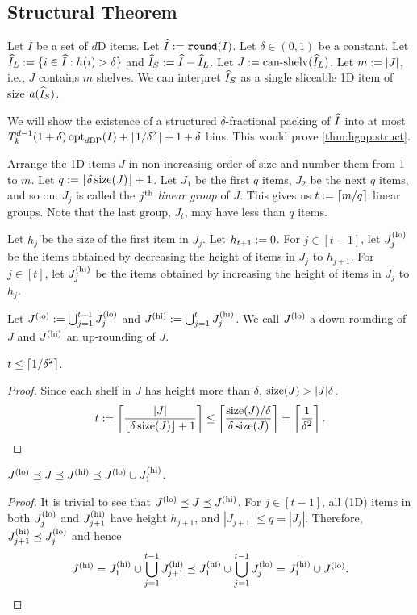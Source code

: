 \subsection{Structural Theorem}
\label{sec:hgap:struct}

Let $I$ be a set of $d$D items.
Let $\widehat{I} := \operatorname{\mathtt{round}}(I)$.
Let $\delta \in (0, 1)$ be a constant.
Let $\widehat{I}_L := \{i \in \widehat{I}: h(i) > \delta\}$ and $\widehat{I}_S := \widehat{I} - \widehat{I}_L$.
Let $J := \operatorname{can-shelv}(\widehat{I}_L)$. Let $m := |J|$, i.e., $J$ contains $m$ shelves.
We can interpret $\widehat{I}_S$ as a single sliceable 1D item of size $a(\widehat{I}_S)$.

We will show the existence of a structured $\delta$-fractional packing of $\widehat{I}$
into at most $T_k^{d-1}(1+\delta)\operatorname{opt}_{d\mathrm{BP}}(I) + \lceil 1/\delta^2 \rceil + 1 + \delta$ bins.
This would prove \cref{thm:hgap:struct}.

\begin{definition}
\label{defn:hgap:lingroup}
Arrange the 1D items $J$ in non-increasing order of size and number them from 1 to $m$.
Let $q := \left\lfloor \delta\operatorname{size}(J) \right\rfloor + 1$.
Let $J_1$ be the first $q$ items, $J_2$ be the next $q$ items, and so on.
$J_j$ is called the $j^{\textrm{th}}$ \emph{linear group} of $J$.
This gives us $t := \left\lceil m/q \right\rceil$ linear groups.
Note that the last group, $J_t$, may have less than $q$ items.

Let $h_j$ be the size of the first item in $J_j$. Let $h_{t+1} := 0$.
For $j \in [t-1]$, let $J_j^{\mathrm{(lo)}}$ be the items obtained by
decreasing the height of items in $J_j$ to $h_{j+1}$.
For $j \in [t]$, let $J_j^{\mathrm{(hi)}}$ be the items obtained by
increasing the height of items in $J_j$ to $h_j$.

Let ${J^{\mathrm{(lo)}} := \bigcup_{j=1}^{t-1} J_j^{\mathrm{(lo)}}}$
and ${J^{\mathrm{(hi)}} := \bigcup_{j=1}^t J_j^{\mathrm{(hi)}}}$.
We call $J^{\mathrm{(lo)}}$ a down-rounding of $J$ and $J^{\mathrm{(hi)}}$ an up-rounding of $J$.
\end{definition}

\begin{lemma}
\label{thm:hgap:n-pivots}
$t \le \lceil 1/\delta^2 \rceil$.
\end{lemma}
\begin{proof}
Since each shelf in $J$ has height more than $\delta$, $\operatorname{size}(J) > |J|\delta$.
\[ t := \left\lceil \frac{|J|}{\left\lfloor \delta\operatorname{size}(J) \right\rfloor+1} \right\rceil
\le \left\lceil \frac{\operatorname{size}(J)/\delta}{\delta\operatorname{size}(J)} \right\rceil
= \left\lceil \frac{1}{\delta^2} \right\rceil.
\qedhere \]
\end{proof}

\begin{lemma}
\label{thm:hgap:pred-chain}
$J^{\mathrm{(lo)}} \preceq J \preceq J^{\mathrm{(hi)}} \preceq J^{\mathrm{(lo)}} \cup J_1^{\mathrm{(hi)}}$.
\end{lemma}
\begin{proof}
It is trivial to see that $J^{\mathrm{(lo)}} \preceq J \preceq J^{\mathrm{(hi)}}$.
For $j \in [t-1]$, all (1D) items in both $J_j^{\mathrm{(lo)}}$ and $J_{j+1}^{\mathrm{(hi)}}$ have height $h_{j+1}$,
and $|J_{j+1}| \le q = |J_j|$. Therefore, $J_{j+1}^{\mathrm{(hi)}} \preceq J_j^{\mathrm{(lo)}}$ and hence
\[ J^{\mathrm{(hi)}} = J_1^{\mathrm{(hi)}} \cup \bigcup_{j=1}^{t-1} J_{j+1}^{\mathrm{(hi)}}
\preceq J_1^{\mathrm{(hi)}} \cup \bigcup_{j=1}^{t-1} J_j^{\mathrm{(lo)}} = J_1^{\mathrm{(hi)}} \cup J^{\mathrm{(lo)}}.
\qedhere \]
\end{proof}

